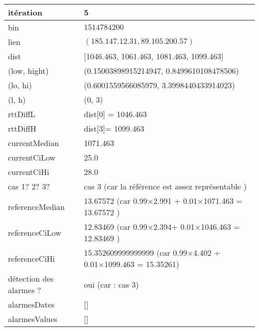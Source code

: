 	\begin{table}[H]
	\centering
	
	\begin{tabularx}{\linewidth}{|l|X| }
		\hline
		itération & 5	\\ \hline
		bin & $1514784200$ \\ \hline
		lien & $(185.147.12.31, 89.105.200.57)$  \\ \hline
		dist& [1046.463, 1061.463, 1081.463, 1099.463]	\\ \hline
		(low, hight)& (0.15003898915214947, 0.8499610108478506) 	\\ \hline
		(lo, hi)&(0.6001559566085979, 3.3998440433914023)  \\ \hline
		(l, h) & (0, 3) 	\\ \hline
		rttDiffL& dist[0] = 1046.463	\\ \hline
		rttDiffH& dist[3]= 1099.463	\\ \hline
		currentMedian& 1071.463	\\ \hline
		currentCiLow& 25.0 	\\ \hline
		currentCiHi& 28.0	\\ \hline
		cas 1? 2? 3?& cas 3 (car la référence est assez représentable )  \\ \hline
		referenceMedian& 13.67572 (car 0.99×2.991 + 0.01×1071.463 = 13.67572 ) 	\\ \hline
		referenceCiLow& 12.83469  (car 0.99×2.394+ 0.01×1046.463 = 12.83469 )	\\ \hline
		referenceCiHi& 15.352609999999999 (car 0.99×4.402 + 0.01×1099.463 = 15.35261)	\\ \hline
		détection des alarmes ?& oui (car : cas 3)	\\ \hline
		alarmesDates& []	\\ \hline
		alarmesValues& []	\\ \hline
		
	\end{tabularx}
\end{table}














